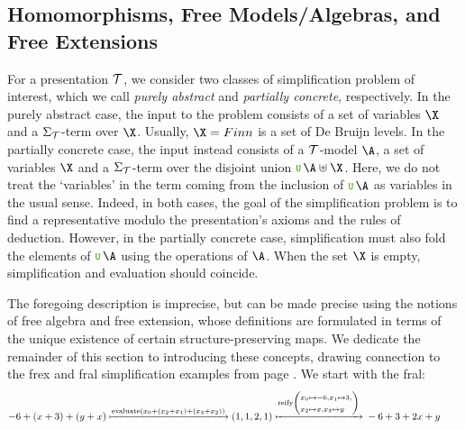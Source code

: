 \subsection{Homomorphisms, Free Models/Algebras, and Free Extensions}
For a presentation $\mathcal{T}$, we consider two classes of simplification problem of interest, which we call \emph{purely abstract} and \emph{partially concrete}, respectively.
%
In the purely abstract case, the input to the problem consists of a set of variables $\X$ and a $\Sigma_{\mathcal{T}}$-term over $\X$.
%
Usually, $\X = \Finn$ is a set of De Bruijn levels.
%
In the partially concrete case, the input instead consists of a $\mathcal{T}$-model $\A$, a set of variables $\X$ and a $\Sigma_{\mathcal{T}}$-term over the disjoint union $\U\,\A \uplus \X$.
%
Here, we do not treat the `variables' in the term coming from the inclusion of $\U\,\A$ as variables in the usual sense.
%
Indeed, in both cases, the goal of the simplification problem is to find a representative modulo the presentation's axioms and the rules of deduction.
%
However, in the partially concrete case, simplification must also fold the elements of $\U\,\A$ using the operations of $\A$.
%
When the set $\X$ is empty, simplification and evaluation should coincide.

The foregoing description is imprecise, but can be made precise using the notions of free algebra and free extension, whose definitions are formulated in terms of the unique existence of certain structure-preserving maps.
%
We dedicate the remainder of this section to introducing these concepts, drawing connection to the frex and fral simplification examples from
page \pageref{new-intro fral example}. We start with the fral:
\begin{equation}
-6 + (x+3) + (y+x)
{}\xmapsto{\text{evaluate}(x_0 + (x_2 + x_1) + (x_3 + x_2))}{}
(1, 1, 2, 1)
{}\xmapsto{\text{reify}\left(\begin{array}{@{}>{\scriptstyle}l@{}}
      x_0 \mapsto -6, x_1 \mapsto 3, \\
      x_2 \mapsto x, x_3 \mapsto y
    \end{array}
\right)}{}
-6 +3 + 2x + y
\qquad
\label{nbe-examples-fral}
\end{equation}

